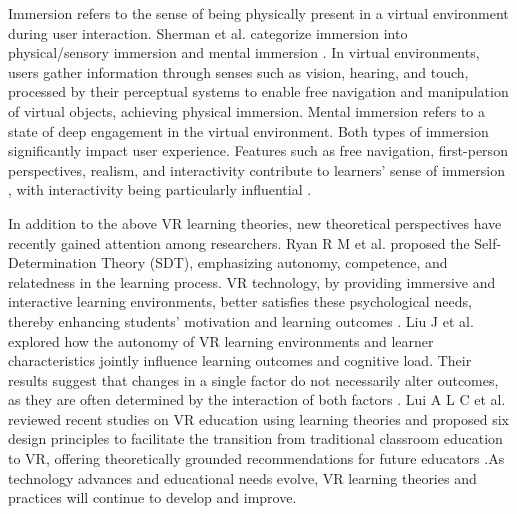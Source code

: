 \documentclass[runningheads]{llncs}
\begin{document}
Immersion refers to the sense of being physically present in a virtual environment during user interaction. Sherman et al. categorize immersion into physical/sensory immersion and mental immersion \cite{sherman2003understanding}. In virtual environments, users gather information through senses such as vision, hearing, and touch, processed by their perceptual systems to enable free navigation and manipulation of virtual objects, achieving physical immersion. Mental immersion refers to a state of deep engagement in the virtual environment. Both types of immersion significantly impact user experience. Features such as free navigation, first-person perspectives, realism, and interactivity contribute to learners' sense of immersion \cite{regenbrecht2002real,mikropoulos2006presence}, with interactivity being particularly influential \cite{schubert2001experience}.

In addition to the above VR learning theories, new theoretical perspectives have recently gained attention among researchers. Ryan R M et al. proposed the Self-Determination Theory (SDT), emphasizing autonomy, competence, and relatedness in the learning process. VR technology, by providing immersive and interactive learning environments, better satisfies these psychological needs, thereby enhancing students' motivation and learning outcomes \cite{ryan2024self}. Liu J et al. explored how the autonomy of VR learning environments and learner characteristics jointly influence learning outcomes and cognitive load. Their results suggest that changes in a single factor do not necessarily alter outcomes, as they are often determined by the interaction of both factors \cite{liu2024autonomy}. Lui A L C et al. reviewed recent studies on VR education using learning theories and proposed six design principles to facilitate the transition from traditional classroom education to VR, offering theoretically grounded recommendations for future educators \cite{lui2023theory}.As technology advances and educational needs evolve, VR learning theories and practices will continue to develop and improve.
\end{document}
